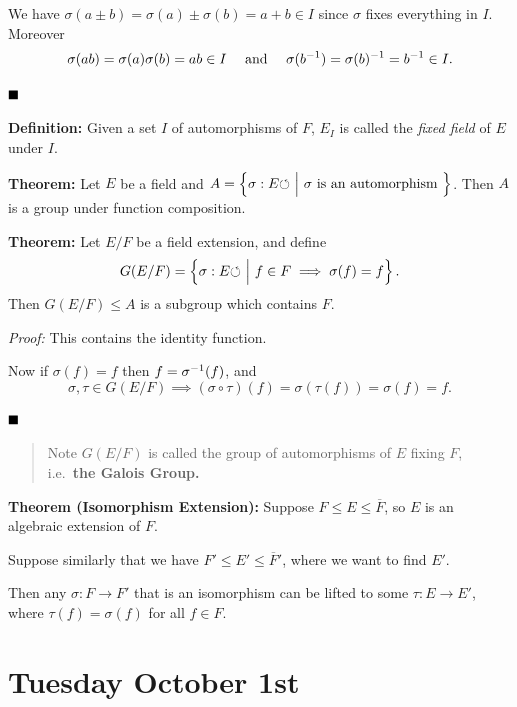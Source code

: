 We have \(\sigma(a\pm b) = \sigma(a) \pm \sigma(b) = a + b \in I\) since
\(\sigma\) fixes everything in \(I\). Moreover \[
\sigma(ab) = \sigma(a)\sigma(b) = ab \in I
\quad \text{ and } \quad
\sigma(b^{-1}) = \sigma(b)^{-1} = b^{-1} \in I
.\]

\(\qed\)

\textbf{Definition:} Given a set \(I\) of automorphisms of \(F\),
\(E_I\) is called the \emph{fixed field} of \(E\) under \(I\).

\textbf{Theorem:} Let \(E\) be a field and
\(A = \left\{{\sigma:E {\circlearrowleft} {~\mathrel{\Big|}~} \sigma\text{ is an automorphism }}\right\}\).
Then \(A\) is a group under function composition.

\textbf{Theorem:} Let \(E/F\) be a field extension, and define \[
G(E/F) = \left\{{\sigma:E{\circlearrowleft} {~\mathrel{\Big|}~} f\in F \implies \sigma(f) = f}\right\}
.\] Then \(G(E/F) \leq A\) is a subgroup which contains \(F\).

\emph{Proof:} This contains the identity function.

Now if \(\sigma(f) = f\) then \(f = \sigma^{-1}(f)\), and \[
\sigma, \tau \in G(E/F) \implies (\sigma \circ \tau)(f) = \sigma(\tau(f)) = \sigma(f) = f
.\]

\(\qed\)

\begin{quote}
Note \(G(E/F)\) is called the group of automorphisms of \(E\) fixing
\(F\), i.e.~\textbf{the Galois Group.}
\end{quote}

\textbf{Theorem (Isomorphism Extension):} Suppose
\(F \leq E \leq \overline F\), so \(E\) is an algebraic extension of
\(F\).

Suppose similarly that we have \(F' \leq E' \leq \overline F'\), where
we want to find \(E'\).

Then any \(\sigma: F \to F'\) that is an isomorphism can be lifted to
some \(\tau: E \to E'\), where \(\tau(f) = \sigma(f)\) for all
\(f\in F\).

\begin{center}
\end{center}

\hypertarget{tuesday-october-1st}{%
\section{Tuesday October 1st}\label{tuesday-october-1st}}

